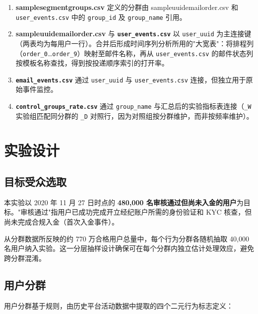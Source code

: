 \documentclass[12pt,a4paper]{ctexart}
\newcommand{\colname}[1]{{\ttfamily\renewcommand{\_}{\textunderscore\allowbreak}#1}}
\begin{document}
\begin{enumerate}[leftmargin=2em]
  \item \textbf{\colname{sample\_segment\_groups.csv}} 定义的分群由 \colname{sample\_uuid\_email\_order.csv} 和 \texttt{user\_events.csv} 中的 \texttt{group\_id} 及 \texttt{group\_name} 引用。
  \item \textbf{\colname{sample\_uuid\_email\_order.csv}} 与 \textbf{\texttt{user\_events.csv}} 以 \texttt{user\_uuid} 为主连接键（两表均为每用户一行）。合并后形成时间序列分析所用的"大宽表"：将排程列（\texttt{order\_0}\ldots\texttt{order\_9}）映射至邮件名称，再从 \texttt{user\_events.csv} 的邮件状态列按模板名称查找，得到按投递顺序索引的打开率。
  \item \textbf{\texttt{email\_events.csv}} 通过 \texttt{user\_uuid} 与 \texttt{user\_events.csv} 连接，但独立用于原始事件监控。
  \item \textbf{\texttt{control\_groups\_rate.csv}} 通过 \texttt{group\_name} 与汇总后的实验指标表连接（\texttt{\_W} 实验组匹配同分群的 \texttt{\_D} 对照行，因为对照组按分群维护，而非按频率维护）。
\end{enumerate}

\clearpage
\section{实验设计}

\subsection{目标受众选取}

本实验以 2020 年 11 月 27 日时点的 \textbf{480,000 名审核通过但尚未入金的用户}为目标。"审核通过"指用户已成功完成开立经纪账户所需的身份验证和 KYC 核查，但尚未完成合规入金（首次入金事件）。

从分群数据所反映的约 770 万合格用户总量中，每个行为分群各随机抽取 40,000 名用户纳入实验。这一分层抽样设计确保可在每个分群内独立估计处理效应，避免跨分群混淆。

\subsection{用户分群}

用户分群基于规则，由历史平台活动数据中提取的四个二元行为标志定义：
\end{document}
